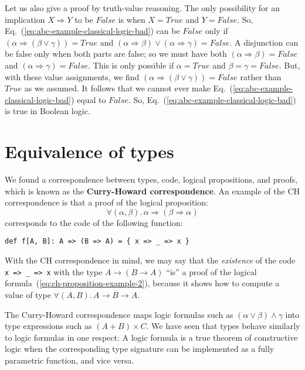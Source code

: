 Let us also give a proof by truth-value reasoning. The only possibility
for an implication $X\Rightarrow Y$ to be $False$ is when $X=True$
and $Y=False$. So, Eq.~(\ref{eq:abc-example-classical-logic-bad})
can be $False$ only if $\left(\alpha\Rightarrow(\beta\vee\gamma)\right)=True$
and $\left(\alpha\Rightarrow\beta\right)\vee\left(\alpha\Rightarrow\gamma\right)=False$.
A disjunction can be false only when both parts are false; so we must
have both $\left(\alpha\Rightarrow\beta\right)=False$ and $\left(\alpha\Rightarrow\gamma\right)=False$.
This is only possible if $\alpha=True$ and $\beta=\gamma=False$.
But, with these value assignments, we find $\left(\alpha\Rightarrow(\beta\vee\gamma)\right)=False$
rather than $True$ as we assumed. It follows that we cannot ever
make Eq.~(\ref{eq:abc-example-classical-logic-bad}) equal to $False$.
So, Eq.~(\ref{eq:abc-example-classical-logic-bad}) is true in Boolean
logic.

\section{Equivalence of types}

We found a correspondence between types, code, logical propositions,
and proofs, which is known as the \textbf{Curry-Howard correspondence}.
An example of the CH correspondence is that a proof of the logical
proposition:
\begin{equation}
\forall(\alpha,\beta).\,\alpha\Rightarrow\left(\beta\Rightarrow\alpha\right)\label{eq:ch-proposition-example-2}
\end{equation}
corresponds to the code of the following function:
\begin{lstlisting}
def f[A, B]: A => (B => A) = { x => _ => x }
\end{lstlisting}
With the CH correspondence in mind, we may say that the \emph{existence}
of the code \lstinline!x => _ => x! with the type $A\rightarrow(B\rightarrow A)$
\textsf{``}is\textsf{''} a proof of the logical formula~(\ref{eq:ch-proposition-example-2}),
because it shows how to compute a value of type $\forall(A,B).\,A\rightarrow B\rightarrow A$.

The Curry-Howard correspondence maps logic formulas such as $(\alpha\vee\beta)\wedge\gamma$
into type expressions such as $\left(A+B\right)\times C$. We have
seen that types behave similarly to logic formulas in one respect:
A logic formula is a true theorem of constructive logic when the corresponding
type signature can be implemented as a fully parametric function,
and vice versa.

